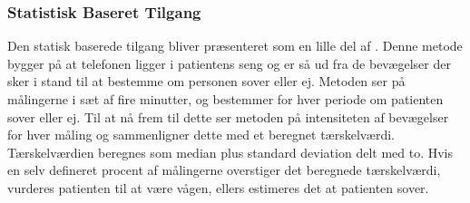 \subsubsection{Statistisk Baseret Tilgang}\label{sec:statbased}
Den statisk baserede tilgang bliver præsenteret som en lille del af \citet{misc:statbased}.
Denne metode bygger på at telefonen ligger i patientens seng og er så ud fra de bevægelser der sker i stand til at bestemme om personen sover eller ej.
Metoden ser på målingerne i sæt af fire minutter, og bestemmer for hver periode om patienten sover eller ej.
Til at nå frem til dette ser metoden på intensiteten af bevægelser for hver måling og sammenligner dette med et beregnet tærskelværdi.
Tærskelværdien beregnes som median plus standard deviation delt med to.
Hvis en selv defineret procent af målingerne overstiger det beregnede tærskelværdi, vurderes patienten til at være vågen, ellers estimeres det at patienten sover.